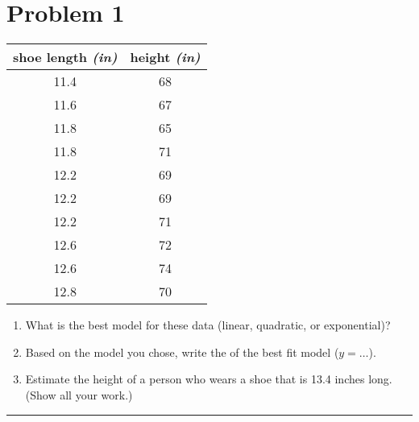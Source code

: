 \section*{Problem 1}

\begin{minipage}{0.3\textwidth}
    \begin{center}
        \begin{tabular}{c|c}
            \toprule
            shoe length {\itshape(in)} & height {\itshape(in)} \\
            \midrule 
            11.4 & 68 \\
            11.6 & 67 \\ 
            11.8 & 65 \\ 
            11.8 & 71 \\ 
            12.2 & 69 \\
            12.2 & 69 \\ 
            12.2 & 71 \\ 
            12.6 & 72 \\
            12.6 & 74 \\ 
            12.8 & 70 \\
            \bottomrule
        \end{tabular}
    \end{center}
\end{minipage}
%
\begin{minipage}{0.7\textwidth}
    \begin{enumerate}[label=(\alph*)]
        \item What is the best model for these data (linear, quadratic, or exponential)?
            \vspace{1\onelineskip}
        \item Based on the model you chose, write the  of the best fit model ($y = \dots$).
        \vspace{1\onelineskip}
        \item Estimate the height of a person who wears a shoe that is 13.4 inches long. (Show all your work.)
        \vspace{4\onelineskip}
    \end{enumerate}
\end{minipage}

\vspace{1\onelineskip}
\hrule
